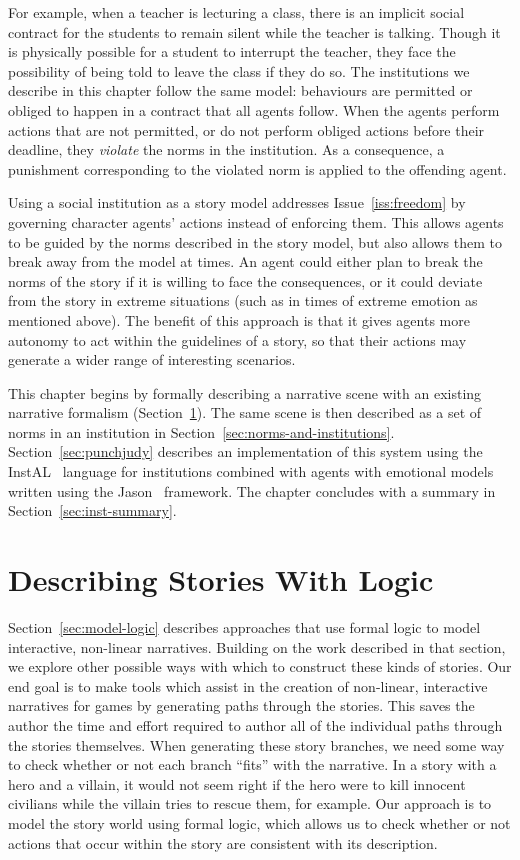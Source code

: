 \documentclass[11pt]{report}
\newcommand{\changed}[2]{%
  \todo[noline,bordercolor=white,color=yellow,size=\scriptsize]{#2}
  \cbcolor{yellow}
  \begin{changebar}
    #1
  \end{changebar}%
  }%
\newcommand{\changed}[2]{#1}
\begin{document}
For example, when a teacher is
lecturing a class, there is an implicit social contract for the students to
remain silent while the teacher is talking. Though it is physically possible for
a student to interrupt the teacher, they face the possibility of being told to
leave the class if they do so. The institutions we describe in this chapter
follow the same model: behaviours are permitted or obliged to happen in a
contract that all agents follow. When the agents perform actions that are not
permitted, or do not perform obliged actions before their deadline, they
\emph{violate} the norms in the institution. As a consequence, a punishment
corresponding to the violated norm is applied to the offending agent.

Using a social institution as a story model addresses Issue~\ref{iss:freedom} by
governing character agents' actions instead of enforcing them. This allows
agents to be guided by the norms described in the
story model, but also allows them to break away from the model at times. An
agent could either plan to break the norms of the story if it is willing to face
the consequences, or it could deviate from the story in extreme situations (such
as in times of extreme emotion as mentioned above). The benefit of this approach
is that it gives agents more autonomy to act within the guidelines of a story,
so that their actions may generate a wider range of interesting scenarios.

\changed{
This chapter begins by formally describing a narrative scene with an
existing narrative formalism (Section~\ref{sec:stories-logic}). The same scene
is then described as a set of norms in an institution in
Section~\ref{sec:norms-and-institutions}. Section~\ref{sec:punchjudy} describes
an implementation of this system using the InstAL~\citep{cliffe2007specifying} language for institutions
combined with agents with emotional models written using the
Jason~\citep{bordini2007programming} framework. The chapter concludes with a
summary in Section~\ref{sec:inst-summary}.
}{Removed reference to Kripke section}

\section{Describing Stories With Logic}
\label{sec:stories-logic}
Section~\ref{sec:model-logic} describes approaches that use formal logic to model interactive, non-linear narratives. Building on the work described in that section, we explore other possible ways with which to construct these kinds of stories.
Our end goal is to make tools which assist in the creation of non-linear,
interactive narratives for games by generating paths through the stories. This
saves the author the time and effort required to author all of the individual
paths through the stories themselves. When generating these story branches, we
need some way to check whether or not each branch ``fits'' with the narrative.
In a story with a hero and a villain, it would not seem right if the hero were
to kill innocent civilians while the villain tries to rescue them, for example.
Our approach is to model the story world using formal logic, which allows us to
check whether or not actions that occur within the story are consistent with its description.
\end{document}
